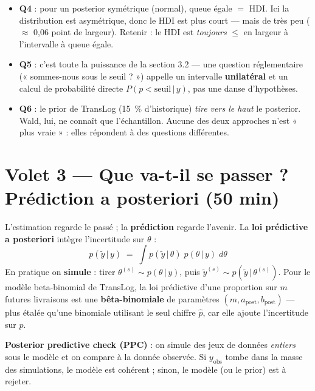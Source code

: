 \documentclass[11pt,a4paper]{article}
\newcommand{\given}{\,\vert\,}
\begin{document}
\begin{piege}[Questions 4 à 6]
\begin{itemize}[leftmargin=4mm, itemsep=0.5mm]
  \item \textbf{Q4} : pour un posterior symétrique (normal), queue égale $=$ HDI.
        Ici la distribution est asymétrique, donc le HDI est plus court ---
        mais de très peu ($\approx$ 0,06 point de largeur). Retenir : le HDI
        est \emph{toujours} $\le$ en largeur à l'intervalle à queue égale.
  \item \textbf{Q5} : c'est toute la puissance de la section 3.2 --- une question
        réglementaire (« sommes-nous sous le seuil ? ») appelle un intervalle
        \textbf{unilatéral} et un calcul de probabilité directe
        $P(p < \text{seuil} \given y)$, pas une danse d'hypothèses.
  \item \textbf{Q6} : le prior de TransLog (15~\% d'historique) \emph{tire vers
        le haut} le posterior. Wald, lui, ne connaît que l'échantillon.
        Aucune des deux approches n'est « plus vraie » : elles répondent à des
        questions différentes.
\end{itemize}
\end{piege}

\section{Volet 3 --- Que va-t-il se passer ? Prédiction a posteriori (50 min)}

\begin{rappel}
L'estimation regarde le passé ; la \textbf{prédiction} regarde l'avenir. La
\textbf{loi prédictive a posteriori} intègre l'incertitude sur $\theta$ :
\[
p(\tilde y \given y) \;=\; \int p(\tilde y \given \theta)\; p(\theta \given y)\; d\theta
\]
En pratique on \textbf{simule} : tirer $\theta^{(s)} \sim p(\theta \given y)$,
puis $\tilde y^{(s)} \sim p(\tilde y \given \theta^{(s)})$. Pour le modèle
beta-binomial de TransLog, la loi prédictive d'une proportion sur $m$
futures livraisons est une \textbf{bêta-binomiale} de paramètres
$(m, a_{\text{post}}, b_{\text{post}})$ --- plus étalée qu'une binomiale
utilisant le seul chiffre $\hat p$, car elle ajoute l'incertitude sur $p$.

\textbf{Posterior predictive check (PPC)} : on simule des jeux de données
\emph{entiers} sous le modèle et on compare à la donnée observée. Si
$y_{\text{obs}}$ tombe dans la masse des simulations, le modèle est cohérent ;
sinon, le modèle (ou le prior) est à rejeter.
\end{rappel}
\end{document}
